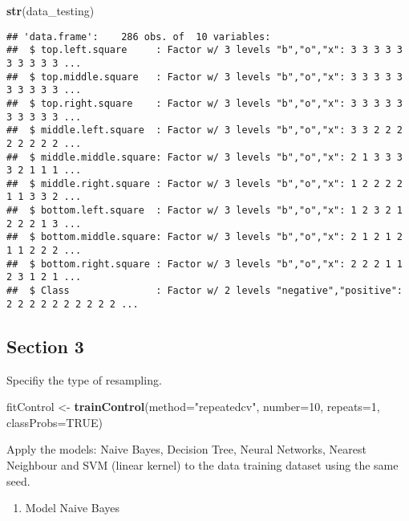 \documentclass[]{article}
\newenvironment{Shaded}{\begin{snugshade}}{\end{snugshade}}
\newcommand{\DataTypeTok}[1]{\textcolor[rgb]{0.13,0.29,0.53}{#1}}
\newcommand{\DecValTok}[1]{\textcolor[rgb]{0.00,0.00,0.81}{#1}}
\newcommand{\KeywordTok}[1]{\textcolor[rgb]{0.13,0.29,0.53}{\textbf{#1}}}
\newcommand{\NormalTok}[1]{#1}
\newcommand{\OtherTok}[1]{\textcolor[rgb]{0.56,0.35,0.01}{#1}}
\newcommand{\StringTok}[1]{\textcolor[rgb]{0.31,0.60,0.02}{#1}}
\providecommand{\tightlist}{%
  \setlength{\itemsep}{0pt}\setlength{\parskip}{0pt}}
\begin{document}
\begin{Shaded}
\begin{Highlighting}[]
\KeywordTok{str}\NormalTok{(data_testing)}
\end{Highlighting}
\end{Shaded}

\begin{verbatim}
## 'data.frame':    286 obs. of  10 variables:
##  $ top.left.square     : Factor w/ 3 levels "b","o","x": 3 3 3 3 3 3 3 3 3 3 ...
##  $ top.middle.square   : Factor w/ 3 levels "b","o","x": 3 3 3 3 3 3 3 3 3 3 ...
##  $ top.right.square    : Factor w/ 3 levels "b","o","x": 3 3 3 3 3 3 3 3 3 3 ...
##  $ middle.left.square  : Factor w/ 3 levels "b","o","x": 3 3 2 2 2 2 2 2 2 2 ...
##  $ middle.middle.square: Factor w/ 3 levels "b","o","x": 2 1 3 3 3 3 2 1 1 1 ...
##  $ middle.right.square : Factor w/ 3 levels "b","o","x": 1 2 2 2 2 1 1 3 3 2 ...
##  $ bottom.left.square  : Factor w/ 3 levels "b","o","x": 1 2 3 2 1 2 2 2 1 3 ...
##  $ bottom.middle.square: Factor w/ 3 levels "b","o","x": 2 1 2 1 2 1 1 2 2 2 ...
##  $ bottom.right.square : Factor w/ 3 levels "b","o","x": 2 2 2 1 1 2 3 1 2 1 ...
##  $ Class               : Factor w/ 2 levels "negative","positive": 2 2 2 2 2 2 2 2 2 2 ...
\end{verbatim}

\hypertarget{section-3}{%
\subsection{Section 3}\label{section-3}}

Specifiy the type of resampling.

\begin{Shaded}
\begin{Highlighting}[]
\NormalTok{fitControl <-}\StringTok{ }\KeywordTok{trainControl}\NormalTok{(}\DataTypeTok{method=}\StringTok{"repeatedcv"}\NormalTok{, }
                           \DataTypeTok{number=}\DecValTok{10}\NormalTok{, }
                           \DataTypeTok{repeats=}\DecValTok{1}\NormalTok{,}
                           \DataTypeTok{classProbs=}\OtherTok{TRUE}\NormalTok{)}
\end{Highlighting}
\end{Shaded}

Apply the models: Naive Bayes, Decision Tree, Neural Networks, Nearest
Neighbour and SVM (linear kernel) to the data training dataset using the
same seed.

\begin{enumerate}
\def\labelenumi{\arabic{enumi}.}
\tightlist
\item
  Model Naive Bayes
\end{enumerate}
\end{document}
